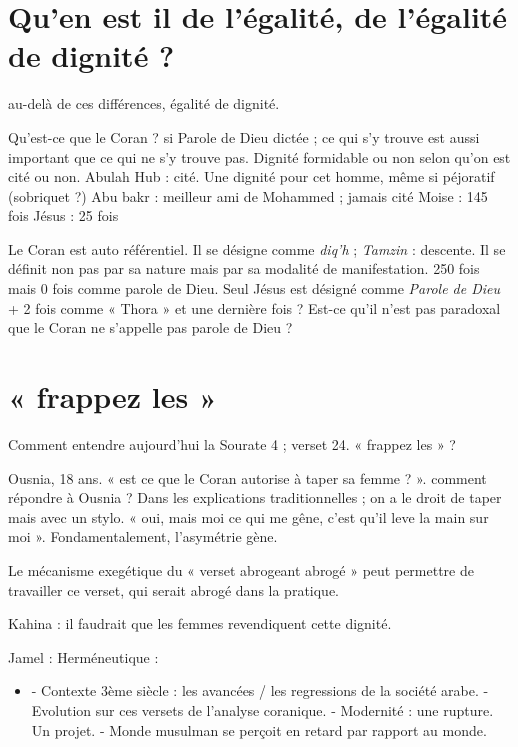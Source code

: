 \section{Qu’en est il de l’égalité, de l’égalité de dignité ? }
au-delà de ces différences, égalité de dignité.


Qu’est-ce que le Coran ? si Parole de Dieu dictée ; ce qui s’y trouve est aussi important que ce qui ne s’y trouve pas. Dignité formidable ou non selon qu’on est cité ou non.
Abulah Hub : cité. Une dignité pour cet homme, même si péjoratif (sobriquet ?)
Abu bakr : meilleur ami de Mohammed ; jamais cité
Moise : 145 fois
Jésus :  25 fois

Le Coran est auto référentiel. Il se désigne comme \textit{diq’h}  ; \textit{Tamzin} : descente. Il se définit non pas par sa nature mais par sa modalité de manifestation. 250 fois mais 0 fois comme parole de Dieu. Seul Jésus est désigné comme \textit{Parole de Dieu} + 2 fois comme « Thora » et une dernière fois ? 
Est-ce qu’il n’est pas paradoxal que le Coran ne s’appelle pas parole de Dieu ?

\section{« frappez les »}

Comment entendre aujourd'hui la Sourate 4 ; verset 24.  « frappez les » ?
\begin{Ex}
Ousnia, 18 ans.  « est ce que le Coran autorise à taper sa femme ? ». comment répondre à Ousnia ? Dans les explications traditionnelles ; on a le droit de taper mais avec un stylo. « oui, mais moi ce qui me gêne, c’est qu’il leve la main sur moi ». Fondamentalement, l’asymétrie gène.
\end{Ex}

Le mécanisme exegétique du « verset abrogeant abrogé »  peut permettre de travailler ce verset, qui serait abrogé dans la pratique.

Kahina : il faudrait que les femmes revendiquent cette dignité.

Jamel : 
Herméneutique : 
\begin{itemize}
    \item -	Contexte 3ème siècle : les avancées / les regressions de la société arabe. 
-	Evolution sur ces versets de l’analyse coranique.
-	Modernité : une rupture. Un projet. 
-	Monde musulman se perçoit en retard par rapport au monde. 
\end{itemize}

